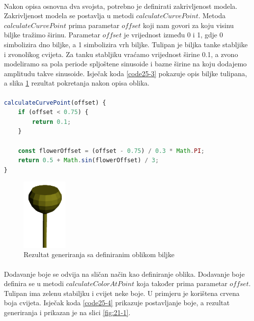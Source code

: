 \documentclass[times, utf8, diplomski]{fer}
\begin{document}
\paragraph{}
Nakon opisa osnovna dva svojsta, potrebno je definirati zakrivljenost modela. Zakrivljenost 
modela se postavlja u metodi $calculateCurvePoint$. Metoda $calculateCurvePoint$ prima 
parametar $offset$ koji nam govori za koju visinu biljke tražimo širinu. Parametar $offset$ 
je vrijednost između 0 i 1, gdje 0 simbolizira dno biljke, a 1 simbolizira vrh biljke.
Tulipan je biljka tanke stabljike i zvonolikog cvijeta. Za tanku stabljiku vraćamo 
vrijednost širine 0.1, a zvono modeliramo sa pola periode spljoštene sinusoide i bazne 
širine na koju dodajemo amplitudu takve sinusoide. Isječak koda \ref{code25-3} pokazuje opis 
biljke tulipana, a slika \ref{fig:25-3} rezultat pokretanja nakon opisa oblika.
\paragraph{}
\begin{lstlisting}[language=Javascript,caption=Postavljanje oblika biljke u ovisnosti o visinu od tla,label=code25-3]
calculateCurvePoint(offset) {
	if (offset < 0.75) {
		return 0.1;
	}

	const flowerOffset = (offset - 0.75) / 0.3 * Math.PI;
	return 0.5 + Math.sin(flowerOffset) / 3;
}
\end{lstlisting}

\begin{figure}[h]
	\centering
	\includegraphics[width=0.2\textwidth]{img/25-3}
	\caption{Rezultat generiranja sa definiranim oblikom biljke}
	\label{fig:25-3}
\end{figure}
\paragraph{}
Dodavanje boje se odvija na sličan način kao definiranje oblika. Dodavanje boje definira se 
u metodi $calculateColorAtPoint$ koja također prima parametar $offset$. Tulipan ima zelenu 
stabiljku i cvijet neke boje. U primjeru je korištena crvena boja cvijeta. Isječak koda 
\ref{code25-4} prikazuje postavljanje boje, a rezultat generiranja i prikazan je na slici 
\ref{fig:21-1}.
\end{document}
